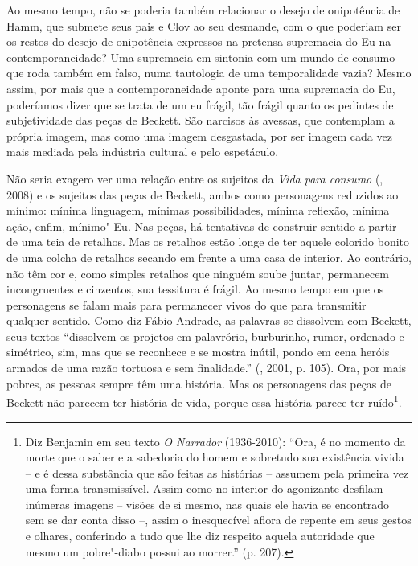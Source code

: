 {Ao mesmo tempo, não se poderia também relacionar o desejo de onipotência
de Hamm, que submete seus pais e Clov ao seu desmande, com o que
poderiam ser os restos do desejo de onipotência expressos na pretensa
supremacia do Eu na contemporaneidade? Uma supremacia em sintonia com um
mundo de consumo que roda também em falso, numa tautologia de uma
temporalidade vazia? Mesmo assim, por mais que a contemporaneidade
aponte para uma supremacia do Eu, poderíamos dizer que se trata de um eu
frágil, tão frágil quanto os pedintes de subjetividade das peças de
Beckett. São narcisos às avessas, que contemplam a própria imagem, mas
como uma imagem desgastada, por ser imagem cada vez mais mediada pela
indústria cultural e pelo espetáculo.

Não seria exagero ver uma relação entre os sujeitos da \emph{Vida para
consumo} (, 2008) e os sujeitos das peças de Beckett, ambos como
personagens reduzidos ao mínimo: mínima linguagem, mínimas
possibilidades, mínima reflexão, mínima ação, enfim, mínimo"-Eu. Nas
peças, há tentativas de construir sentido a partir de uma teia de
retalhos. Mas os retalhos estão longe de ter aquele colorido bonito de
uma colcha de retalhos secando em frente a uma casa de interior. Ao
contrário, não têm cor e, como simples retalhos que ninguém soube
juntar, permanecem incongruentes e cinzentos, sua tessitura é frágil. Ao
mesmo tempo em que os personagens se falam mais para permanecer vivos do
que para transmitir qualquer sentido. Como diz Fábio Andrade, as
palavras se dissolvem com Beckett, seus textos ``dissolvem os projetos
em palavrório, burburinho, rumor, ordenado e simétrico, sim, mas que se
reconhece e se mostra inútil, pondo em cena heróis armados de uma razão
tortuosa e sem finalidade.'' (, 2001, p. 105). Ora, por mais
pobres, as pessoas sempre têm uma história. Mas os personagens das peças
de Beckett não parecem ter história de vida, porque essa história parece
ter ruído\footnote{Diz Benjamin em seu texto \emph{O Narrador}
  (1936-2010): ``Ora, é no momento da morte que o saber e a sabedoria do
  homem e sobretudo sua existência vivida -- e é dessa substância que
  são feitas as histórias -- assumem pela primeira vez uma forma
  transmissível. Assim como no interior do agonizante desfilam inúmeras
  imagens -- visões de si mesmo, nas quais ele havia se encontrado sem
  se dar conta disso --, assim o inesquecível aflora de repente em seus
  gestos e olhares, conferindo a tudo que lhe diz respeito aquela
  autoridade que mesmo um pobre"-diabo possui ao morrer.'' (p. 207).}.

}
